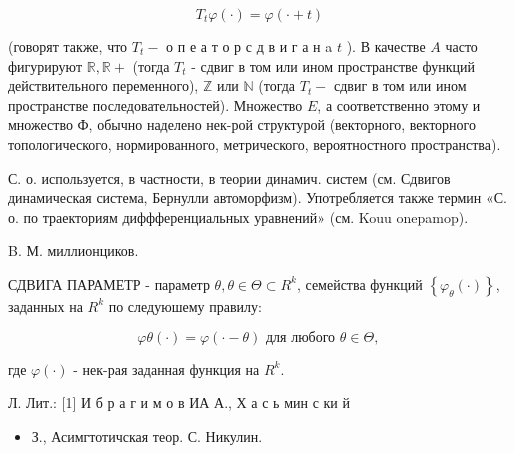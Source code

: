 \documentclass[10pt]{article}
\begin{document}
\[

T_{t} \varphi(\cdot)=\varphi(\cdot+t)

\]



(говорят также, что $T_{t}-$ о п е а т о р с д в и г а н a $t$ ). В качестве $A$ часто фигурируют $\mathbb{R}, \mathbb{R}+$ (тогда $T_{t}$ - сдвиг в том или ином пространстве функций действительного переменного), $\mathbb{Z}$ или $\mathbb{N}$ (тогда $T_{t}-$ сдвиг в том или ином пространстве последовательностей). Множество $E$, а соответственно этому и множество Ф, обычно наделено нек-рой структурой (векторного, векторного топологического, нормированного, метрического, вероятностного пространства).



С. о. используется, в частности, в теории динамич. систем (см. Сдвигов динамическая система, Бернулли автоморфизм). Употребляется также термин «С. о. по траекториям диффференциальных уравнений» (см. Kouu onepamop).



B. М. миллионциков.



СДВИГА ПАРАМЕТР - параметр $\theta, \theta \in \Theta \subset R^{k}$, семейства функций $\left\{\varphi_{\theta}(\cdot)\right\}$, заданных на $R^{k}$ по следуюшему правилу:



\[

\varphi \theta(\cdot)=\varphi(\cdot-\theta) \text { для любого } \theta \in \Theta \text {, }

\]



где $\varphi(\cdot)$ - нек-рая заданная функция на $R^{k}$.



Л. Лит.: [1] И б р а г и м о в ИА А., Х а с ь мин с ки й



\begin{itemize}

  \item З., Асимгтотичская теор. С. Никулин.

\end{itemize}
\end{document}
